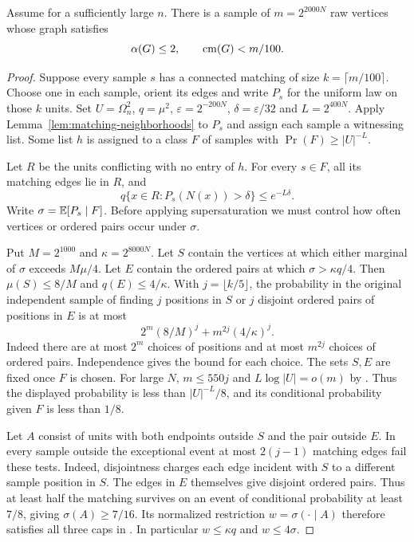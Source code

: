 \begin{proposition}\label{prop:raw-to-graph}
Assume  for a sufficiently large \(n\).
There is a sample of \(m=2^{2000N}\) raw vertices whose graph satisfies
\[
 \alpha(G)\le2,\qquad \operatorname{cm}(G)<m/100.
\]
\end{proposition}
\begin{proof}
Suppose every sample \(s\) has a connected matching of size
\(k=\lceil m/100\rceil\). Choose one in each sample, orient its edges
and write \(P_s\) for the uniform law on those \(k\) units.
Set \(U=\Omega_n^2\), \(q=\mu^2\), \(\varepsilon=2^{-200N}\),
\(\delta=\varepsilon/32\) and \(L=2^{400N}\).
Apply Lemma~\ref{lem:matching-neighborhoods} to \(P_s\) and assign each
sample a witnessing list. Some list \(h\) is assigned to a class \(F\)
of samples with \(\Pr(F)\ge |U|^{-L}\).

Let \(R\) be the units conflicting with no entry of \(h\).
For every \(s\in F\), all its matching edges lie in \(R\), and
\[
 q\{x\in R:P_s(N(x))>\delta\}\le e^{-L\delta}.
\]
Write \(\sigma=\mathbb E[P_s\mid F]\). Before applying supersaturation we must
control how often vertices or ordered pairs occur under \(\sigma\).

Put \(M=2^{1000}\) and \(\kappa=2^{8000N}\). Let \(S\) contain the
vertices at which either marginal of \(\sigma\) exceeds \(M\mu/4\).
Let \(E\) contain the ordered pairs at which \(\sigma>\kappa q/4\).
Then \(\mu(S)\le8/M\) and \(q(E)\le4/\kappa\). With
\(j=\lfloor k/5\rfloor\), the probability in the original independent
sample of finding \(j\) positions in \(S\) or \(j\) disjoint ordered
pairs of positions in \(E\) is at most
\[
   2^m(8/M)^j+m^{2j}(4/\kappa)^j.
\]
Indeed there are at most \(2^m\) choices of positions and at most
\(m^{2j}\) choices of ordered pairs. Independence gives the bound for
each choice. The sets \(S,E\) are fixed once \(F\) is chosen.
For large \(N\), \(m\le550j\) and \(L\log |U|=o(m)\) by
. Thus the displayed probability is less than
\(|U|^{-L}/8\), and its conditional probability given \(F\) is less than \(1/8\).

Let \(A\) consist of units with both endpoints outside \(S\) and the pair outside
\(E\). In every sample outside the exceptional event at most \(2(j-1)\)
matching edges fail these tests. Indeed, disjointness charges each edge incident with \(S\) to a
different sample position in \(S\). The edges in \(E\) themselves give
disjoint ordered pairs. Thus at least half the matching survives on an
event of conditional probability at least \(7/8\), giving
\(\sigma(A)\ge7/16\). Its normalized restriction \(w=\sigma(\cdot\mid A)\)
therefore satisfies all three caps in . In
particular \(w\le\kappa q\) and \(w\le4\sigma\).


\end{proof}
